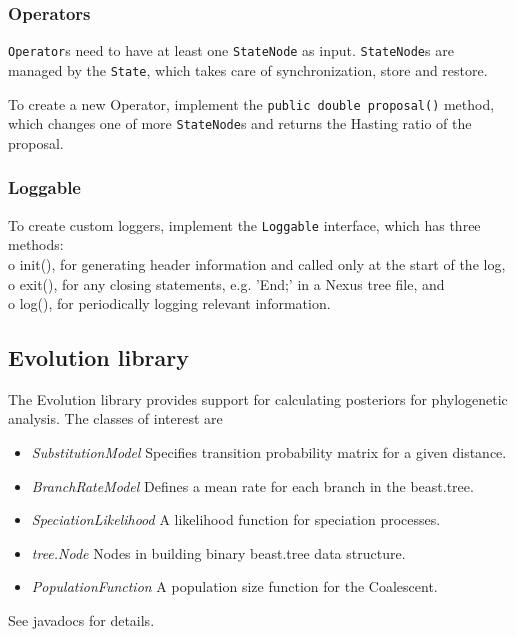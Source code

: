\documentclass{article}
\begin{document}
\subsubsection{Operators\label{ssec.oper}}

{\tt Operator}s need to have at least one {\tt StateNode} as input.
{\tt StateNode}s are managed by the {\tt State}, which takes care of synchronization,
store and restore.

To create a new Operator, implement the {\tt public double proposal()} method, 
which changes one of more {\tt StateNode}s and returns the Hasting ratio of the proposal.


\subsubsection{Loggable\label{ssec.logger}}

To create custom loggers, implement the {\tt Loggable} interface, which has three methods:\\
o init(), for generating header information and called only at the start of the log,\\
o exit(), for any closing statements, e.g. 'End;' in a Nexus tree file, and\\
o log(), for periodically logging relevant information.



\subsection{Evolution library\label{ssec.evo}}

The Evolution library provides support for calculating posteriors for
phylogenetic analysis. The classes of interest are
\begin{itemize}
\item{\em SubstitutionModel} Specifies transition probability matrix for a given distance.
\item{\em BranchRateModel} Defines a mean rate for each branch in the beast.tree.
\item{\em SpeciationLikelihood} A likelihood function for speciation processes.
\item{\em tree.Node} Nodes in building binary beast.tree data structure.
\item{\em PopulationFunction} A population size function for the Coalescent.
\end{itemize}

See javadocs for details.
\end{document}
